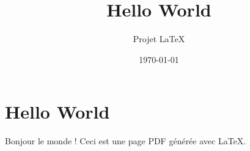 \documentclass[a4paper,12pt]{article}
\title{Hello World}
\author{Projet LaTeX}
\date{\today}
\begin{document}
\maketitle

\section*{Hello World}

Bonjour le monde ! Ceci est une page PDF générée avec \LaTeX.
\end{document}
